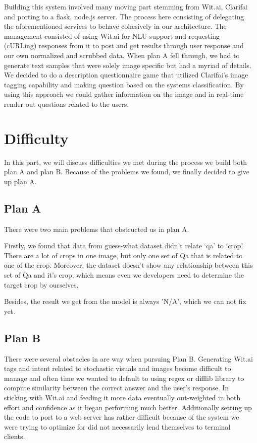 \documentclass[11pt,a4paper]{article}
\begin{document}
Building this system involved many moving part stemming from Wit.ai, Clarifai and porting to a flask, node.js server. The process here consisting of delegating the aforementioned services to behave cohesively in our architecture. The management consisted of using Wit.ai for NLU support and requesting (cURLing) responses from it to post and get results through user response and our own normalized and scrubbed data. 
When plan A fell through, we had to generate text samples that were solely image specific but had a myriad of details. We decided to do a description questionnaire game that utilized Clarifai's image tagging capability and making question based on the systems classification. By using this approach we could gather information on the image and in real-time render out questions related to the users. 


\section{Difficulty}

In this part, we will discuss difficulties we met during the process we build both plan A and plan B. Because of the problems we found, we finally decided to give up plan A.

\subsection{Plan A}
\label{sec:length}

There were two main problems that obstructed us in plan A.

Firstly, we found that data from guess-what dataset didn’t relate ‘qa’ to ‘crop’. There are a lot of crops
in one image, but only one set of Qa that is related to one of the crop. Moreover, the dataset doesn't show any relationship between this set of Qa and it's crop, which means even we developers need to determine the target crop by ourselves.

Besides, the result we get from the model is always 'N/A', which we can not fix yet.


\subsection{Plan B}
\label{sec:length}

There were several obstacles in are way when pursuing Plan B. Generating Wit.ai tags and intent related to stochastic visuals and images become difficult to manage and often time we wanted to default to using regex or difflib library to compute similarity between the correct answer and the user’s response. In sticking with Wit.ai and feeding it more data eventually out-weighted in both effort and confidence as it began performing much better. Additionally setting up the code to port to a web server has rather difficult because of the system we were trying to optimize for did not necessarily lend themselves to terminal clients. 
\end{document}
